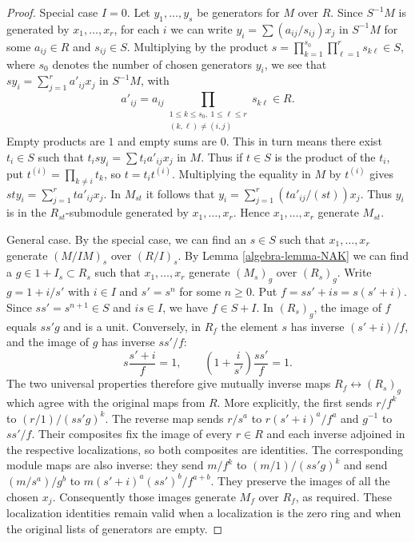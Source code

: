 \begin{proof}
Special case $I = 0$. Let $y_1, \ldots, y_s$ be generators for $M$ over $R$.
Since $S^{-1}M$ is generated by $x_1, \ldots, x_r$, for each $i$
we can write $y_i = \sum (a_{ij}/s_{ij})x_j$ in $S^{-1}M$
for some $a_{ij} \in R$ and $s_{ij} \in S$. Multiplying by the product
$s=\prod_{k=1}^{s_0}\prod_{\ell=1}^r s_{k\ell}\in S$,
where $s_0$ denotes the number of chosen generators $y_i$, we see that
$sy_i = \sum_{j=1}^r a'_{ij}x_j$ in $S^{-1}M$, with
$$
a'_{ij}=a_{ij}
\prod_{\substack{1\leq k\leq s_0,\ 1\leq\ell\leq r\\(k,\ell)\ne(i,j)}}
s_{k\ell}\in R.
$$
Empty products are $1$ and empty sums are $0$.
This in turn means there exist $t_i \in S$ such that
$t_isy_i = \sum t_ia'_{ij}x_j$ in $M$. Thus if $t \in S$
is the product of the $t_i$, put
$t^{(i)}=\prod_{k\ne i}t_k$, so $t=t_it^{(i)}$.
Multiplying the equality in $M$ by $t^{(i)}$ gives
$sty_i=\sum_{j=1}^r t a'_{ij}x_j$.
In $M_{st}$ it follows that
$y_i=\sum_{j=1}^r(t a'_{ij}/(st))x_j$.
Thus $y_i$ is in the $R_{st}$-submodule generated by
$x_1,\ldots,x_r$. Hence $x_1, \ldots, x_r$ generate $M_{st}$.

\medskip\noindent
General case. By the special case, we can find an $s \in S$
such that $x_1, \ldots, x_r$ generate $(M/IM)_s$ over $(R/I)_s$.
By Lemma \ref{algebra-lemma-NAK} we can find a $g \in 1 + I_s \subset R_s$
such that $x_1, \ldots, x_r$ generate $(M_s)_g$ over $(R_s)_g$.
Write $g=1+i/s'$ with $i\in I$ and $s'=s^n$ for some
$n\geq0$. Put $f=ss'+is=s(s'+i)$. Since $ss'=s^{n+1}\in S$
and $is\in I$, we have $f\in S+I$.
In $(R_s)_g$, the image of $f$ equals $ss'g$ and is a unit.
Conversely, in $R_f$ the element $s$ has inverse $(s'+i)/f$,
and the image of $g$ has inverse $ss'/f$:
$$
s\frac{s'+i}{f}=1,\qquad
\left(1+\frac{i}{s'}\right)\frac{ss'}{f}=1.
$$
The two universal properties therefore give mutually inverse maps
$R_f\longleftrightarrow(R_s)_g$ which agree with the original
maps from $R$. More explicitly, the first sends $r/f^k$ to
$(r/1)/(ss'g)^k$. The reverse map sends
$r/s^a$ to $r(s'+i)^a/f^a$ and $g^{-1}$ to $ss'/f$.
Their composites fix the image of every $r\in R$ and each inverse
adjoined in the respective localizations, so both composites are identities.
The corresponding module maps are also inverse: they send
$m/f^k$ to $(m/1)/(ss'g)^k$ and send
$(m/s^a)/g^b$ to $m(s'+i)^a(ss')^b/f^{a+b}$.
They preserve the images of all the chosen $x_j$.
Consequently those images generate $M_f$ over $R_f$, as required.
These localization identities remain valid when a localization is
the zero ring and when the original lists of generators are empty.
\end{proof}